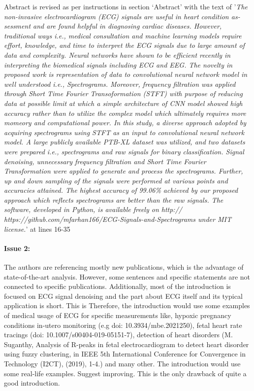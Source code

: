 \documentclass{article}
\begin{document}
Abstract is revised as per instructions in section `Abstract' with the text of '\textit{The non-invasive electrocardiogram (ECG) signals are useful in heart condition as-sessment and are found helpful in diagnosing cardiac diseases. However, traditional ways i.e., medical consultation and machine learning models require effort, knowledge, and time to interpret the ECG signals due to large amount of data and complexity. Neural networks have shown to be efficient recently in interpreting the biomedical signals including ECG and EEG. The novelty in proposed work is representation of data to convolutional neural network model in well understood i.e., Spectrograms. Moreover, frequency filtration was applied through Short Time Fourier Transoformation (STFT) with purpose of reducing data at possible limit at which a simple architecture of CNN model showed high accuracy rather than to utilize the complex model which ultimately requires more momeory and computational power. In this study, a diverse approach adopted by acquiring spectrograms using STFT as an input to convolutional neural network model. A large publicly available PTB-XL dataset was utilized, and two datasets were prepared i.e., spectrograms and raw signals for binary classification. Signal denoising, unnecessary frequency filtration and Short Time Fourier Transformation were applied to generate and process the spectrograms. Further, up and down sampling of the signals were performed at various points and accuracies attained. The highest accuracy of 99.06\% achieved by our proposed approach which reflects spectrograms are better than the raw signals. The software, developed in Python, is available freely on http:// https://github.com/mfarhan166/ECG-Signals-and-Spectrograms under MIT license.}' at lines 16-35

\paragraph{Issue 2:}
\begin{displayquote}
The authors are referencing mostly new publications, which is the advantage of state-of-the-art analysis. However, some sentences and specific statements are not connected to specific publications.
Additionally, most of the introduction is focused on ECG signal denoising and the part about ECG itself and its typical application is short. This is Therefore, the introduction would use some examples of medical usage of ECG for specific measurements like, hypoxic pregnancy conditions in-utero monitoring (e.g doi: 10.3934/mbe.2021250), fetal heart rate tracings (doi: 10.1007/s00404-019-05151-7), detection of heart disorders (M. Suganthy, Analysis of R-peaks in fetal electrocardiogram to detect heart disorder using fuzzy clustering, in IEEE 5th International Conference for Convergence in Technology (I2CT), (2019), 1-4.) and many other. The introduction would use some real-life examples. Suggest improving. This is the only drawback of quite a good introduction.
\end{displayquote}
\end{document}
